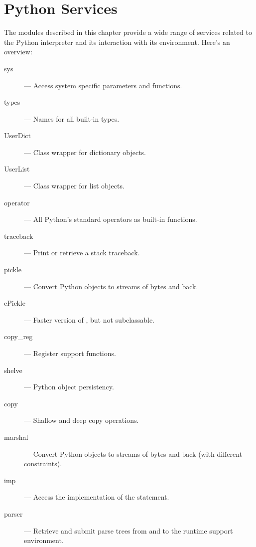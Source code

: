 \chapter{Python Services}
\label{python}

The modules described in this chapter provide a wide range of services
related to the Python interpreter and its interaction with its
environment.  Here's an overview:

\begin{description}

\item[sys]
--- Access system specific parameters and functions.

\item[types]
--- Names for all built-in types.

\item[UserDict]
--- Class wrapper for dictionary objects.

\item[UserList]
--- Class wrapper for list objects.

\item[operator]
--- All Python's standard operators as built-in functions.

\item[traceback]
--- Print or retrieve a stack traceback.

\item[pickle]
--- Convert Python objects to streams of bytes and back.

\item[cPickle]
--- Faster version of , but not subclassable.

\item[copy_reg]
--- Register  support functions.

\item[shelve]
--- Python object persistency.

\item[copy]
--- Shallow and deep copy operations.

\item[marshal]
--- Convert Python objects to streams of bytes and back (with
different constraints).

\item[imp]
--- Access the implementation of the  statement.

\item[parser]
--- Retrieve and submit parse trees from and to the runtime support
environment.


\end{description}
